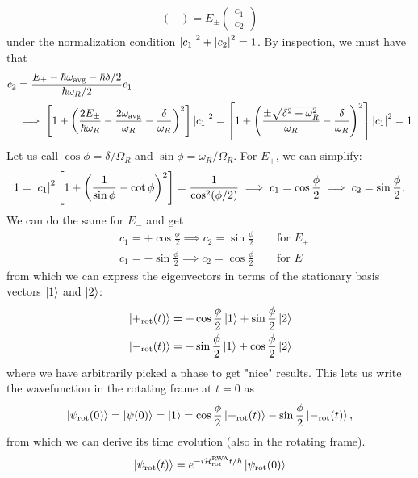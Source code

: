 \documentclass{article}
\theoremstyle{definition}
\newcommand{\ham}{\mathcal{H}}
\newcommand{\f}[2]{\frac{#1}{#2}}
\newcommand{\lp}{\left(}
\newcommand{\rp}{\right)}
\newcommand{\lb}{\left[}
\newcommand{\rb}{\right]}
\newcommand{\psirot}{\ket{\psi_\text{rot}(t)} }
\newcommand{\RWA}{\ham_\text{rot}^\text{RWA}}
\begin{document}
\begin{enumerate}[label=\alph*)]
\begin{align*}
\begin{pmatrix}
	\end{pmatrix} = E_\pm \begin{pmatrix}
	c_1 \\ c_2
	\end{pmatrix}
	\end{align*}	
	under the normalization condition $\abs{c_1}^2 + \abs{c_2}^2 = 1$. By inspection, we must have that
	\begin{align*}
	c_2 &=  \f{E_\pm - \hbar \omega_\text{avg} - \hbar \delta/2}{\hbar \omega_R/2} c_1 \\
	&\implies \lb 1 + \lp \f{2E_\pm}{\hbar \omega_R}  - \f{2\omega_\text{avg}}{\omega_R} - \f{\delta}{\omega_R}\rp^2 \rb \abs{c_1}^2 = \lb 1 + \lp  \f{\pm \sqrt{\delta^2+\omega_R^2}}{\omega_R} - \f{\delta}{\omega_R}\rp^2 \rb \abs{c_1}^2 = 1
	\end{align*}
	Let us call $\cos\phi = \delta/\Omega_R$ and $\sin\phi = \omega_R / \Omega_R$. For $E_+$, we can simplify:
	\begin{align*}
	1 = \abs{c_1}^2 \lb 1+ \lp \f{1}{\sin\phi} - \cot\phi \rp^2 \rb = \f{1}{\cos^2(\phi/2)} \implies c_1 = \cos\f{\phi}{2} \implies c_2 = \sin\f{\phi}{2}.
	\end{align*}
	We can do the same for $E_-$ and get
	\begin{align*}
	&c_1 = +\cos\f{\phi}{2} \implies c_2 = \sin\f{\phi}{2} \quad\quad\text{for } E_+\\
	&c_1 = -\sin\f{\phi}{2} \implies c_2 = \cos\f{\phi}{2} \quad\quad\text{for } E_-
	\end{align*}
	from which we can express the eigenvectors in terms of the stationary basis vectors $\ket{1}$ and $\ket{2}$:
	\begin{align*}
	&\ket{+_\text{rot}(t)} = +\cos \f{\phi}{2} \ket{1} + \sin\f{\phi}{2}\ket{2} \\
	&\ket{-_\text{rot}(t)} = -\sin \f{\phi}{2} \ket{1} + \cos\f{\phi}{2}\ket{2}
	\end{align*}
	where we have arbitrarily picked a phase to get "nice" results. This lets us write the wavefunction in the rotating frame at $t=0$ as 
	\begin{align*}
	\ket{\psi_\text{rot}(0)} = \ket{\psi(0)} = \ket{1} = \cos\f{\phi}{2}\ket{+_\text{rot}(t)} -\sin\f{\phi}{2}\ket{-_\text{rot}(t)},
	\end{align*}
	from which we can derive its time evolution (also in the rotating frame). 
	\begin{align*}
	\psirot 
	&= e^{-i \RWA t/\hbar} \ket{\psi_\text{rot}(0)} \\

\end{align*}
\end{enumerate}
\end{document}
